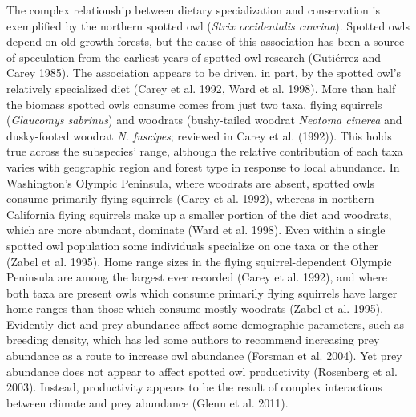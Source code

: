\documentclass{sfuthesis}
\begin{document}
The complex relationship between dietary specialization and conservation is exemplified by the northern spotted owl (\emph{Strix occidentalis caurina}). Spotted owls depend on old-growth forests, but the cause of this association has been a source of speculation from the earliest years of spotted owl research (Gutiérrez and Carey 1985). The association appears to be driven, in part, by the spotted owl's relatively specialized diet (Carey et al. 1992, Ward et al. 1998). More than half the biomass spotted owls consume comes from just two taxa, flying squirrels (\emph{Glaucomys sabrinus}) and woodrats (bushy-tailed woodrat \emph{Neotoma cinerea} and dusky-footed woodrat \emph{N. fuscipes}; reviewed in Carey et al. (1992)). This holds true across the subspecies' range, although the relative contribution of each taxa varies with geographic region and forest type in response to local abundance. In Washington's Olympic Peninsula, where woodrats are absent, spotted owls consume primarily flying squirrels (Carey et al. 1992), whereas in northern California flying squirrels make up a smaller portion of the diet and woodrats, which are more abundant, dominate (Ward et al. 1998). Even within a single spotted owl population some individuals specialize on one taxa or the other (Zabel et al. 1995). Home range sizes in the flying squirrel-dependent Olympic Peninsula are among the largest ever recorded (Carey et al. 1992), and where both taxa are present owls which consume primarily flying squirrels have larger home ranges than those which consume mostly woodrats (Zabel et al. 1995). Evidently diet and prey abundance affect some demographic parameters, such as breeding density, which has led some authors to recommend increasing prey abundance as a route to increase owl abundance (Forsman et al. 2004). Yet prey abundance does not appear to affect spotted owl productivity (Rosenberg et al. 2003). Instead, productivity appears to be the result of complex interactions between climate and prey abundance (Glenn et al. 2011).
\end{document}

